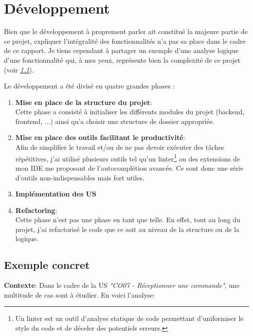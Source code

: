 \section{Développement}

Bien que le développement à proprement parler ait constitué la majeure partie de ce projet, expliquer l'intégralité des fonctionnalités n'a pas sa place dans le cadre de ce rapport. Je tiens cependant à partager un exemple d'une analyse logique d'une fonctionnalité qui, à mes yeux, représente bien la complexité de ce projet (voir \textit{\ref{exemple_dev}}). 

\newpara

Le développement a été divisé en quatre grandes phases :
\begin{enumerate}
  \item \textbf{Mise en place de la structure du projet}: \\ Cette phase a consisté à initialiser les différents modules du projet (backend, frontend, ...) ainsi qu'a choisir une structure de dossier appropriée. 
  \item\textbf{Mise en place des outils facilitant le productivité}: \\ Afin de simplifier le travail et/ou de ne pas devoir exécuter des tâches répétitives, j'ai utilisé plusieurs outils tel qu'un linter\footnote{Un linter est un outil d'analyse statique de code permettant d'uniformiser le style du code et de déceler des potentiels erreurs.} ou des extensions de mon IDE me proposant de l'autocomplétion avancée. Ce sont donc une série d'outils non-indispensables mais fort utiles.
  \item \textbf{Implémentation des US}
  \item \textbf{Refactoring}: \\ Cette phase n'est pas une phase en tant que telle. En effet, tout au long du projet, j'ai refactorisé le code que ce soit au niveau de la structure ou de la logique. 
\end{enumerate}

\subsection{Exemple concret}
\label{exemple_dev}
\textbf{Contexte}: Dans le cadre de la US \textit{"CO07 - Réceptionner une commande"}, une multitude de cas sont à étudier. En voici l'analyse: 

\newpara

